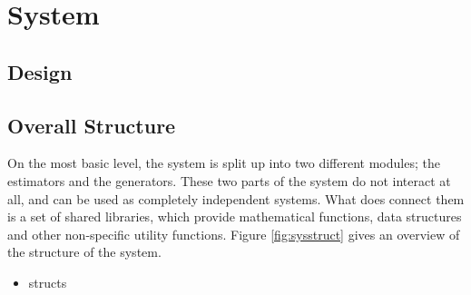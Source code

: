 \documentclass[a4paper,11pt]{article}
\begin{document}
\section{System}
\label{sec-3}
\subsection{Design}
\label{sec-3-1}
\subsection{Overall Structure}
\label{sec-3-2}

On the most basic level, the system is split up into two different modules; the
estimators and the generators. These two parts of the system do not interact at
all, and can be used as completely independent systems. What does connect them
is a set of shared libraries, which provide mathematical functions, data
structures and other non-specific utility functions. Figure \ref{fig:sysstruct}
gives an overview of the structure of the system.
\begin{itemize}
\item structs
\end{itemize}
\end{document}
